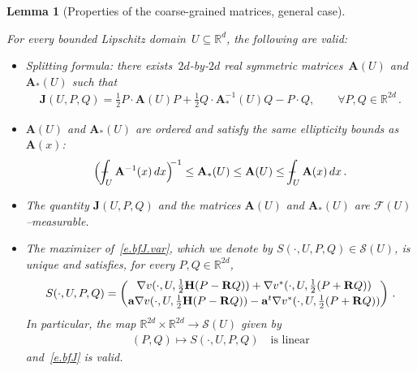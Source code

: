 \documentclass[11pt]{article} %
\numberwithin{equation}{section}
\newtheorem{lemma}[theorem]{Lemma}
\theoremstyle{definition}
\newcommand*{\R}{\ensuremath{\mathbb{R}}}
\newcommand*{\Rd}{\ensuremath{\mathbb{R}^d}}
\renewcommand{\a}{\mathbf{a}}
\newcommand{\F}{\mathcal{F}}
\def\Xint#1{\mathchoice
{\XXint\displaystyle\textstyle{#1}}%
{\XXint\textstyle\scriptstyle{#1}}%
{\XXint\scriptstyle\scriptscriptstyle{#1}}%
{\XXint\scriptscriptstyle\scriptscriptstyle{#1}}%
\!\int}
\def\XXint#1#2#3{{\setbox0=\hbox{$#1{#2#3}{\int}$}
\vcenter{\hbox{$#2#3$}}\kern-.5\wd0}}
\def\fint{\Xint-}
\newcommand{\bfA}{\mathbf{A}}
\newcommand{\bfJ}{\mathbf{J}}
\newcommand{\rota}{\mathbf{R}}
\newcommand{\refl}{\mathbf{H}}
\begin{document}
\begin{lemma}[Properties of the coarse-grained matrices, general case]
\label{l.J.basicprops.nonsymm}

For every bounded Lipschitz domain~$U \subseteq\Rd$, the following are valid:

\begin{itemize} 

\item Splitting formula: there exists~$2d$-by-$2d$ real symmetric matrices~$\bfA(U)$ and $\bfA_*(U)$ such that  
\begin{align}
\label{e.Jsplitting.nonsymm}
\bfJ(U,P,Q )
=
\frac12 P \cdot \bfA(U) P 
+ 
\frac12 Q \cdot \bfA_*^{-1}(U) Q
- P \cdot Q, \qquad \forall P,Q  \in \R^{2d}
\,.
\end{align}



\item $\bfA(U)$ and $\bfA_*(U)$ are ordered and satisfy the same ellipticity bounds as~$\bfA(x)$:
\begin{equation}
\label{e.A.bounds.nonsymm}
\Bigl( \fint_{U} \bfA^{-1} (x)\,dx \Bigr)^{\!\!-1} 
\leq 
\bfA_*(U) 
\leq 
\bfA(U) 
\leq 
\fint_U \bfA(x)\,dx 
\,.
\end{equation}

\item The quantity $\bfJ(U,P,Q )$ and the matrices $\bfA(U)$ and $\bfA_*(U)$ are $\F(U)$--measurable. 

\item The maximizer of~\eqref{e.bfJ.var}, which we denote by $S(\cdot,U,P,Q )  \in \mathcal{S}(U)$, is unique and satisfies, for every $P,Q\in\R^{2d}$,
\begin{equation}
\label{e.Stovvstar}
S( \cdot, U, P , Q)
=
\begin{pmatrix} 
\nabla v (\cdot,U,\tfrac12 \refl( P -  \rota Q))
+
\nabla v^* (\cdot,U,\tfrac12 ( P +  \rota Q))
\vspace{0.2em} \\ 
\a \nabla v (\cdot,U,\tfrac12 \refl( P -  \rota Q))
- \a^t \nabla v^*  (\cdot,U,\tfrac12 ( P +  \rota Q))
\end{pmatrix}\,.
\end{equation}
In particular, the map $\R^{2d}\times\R^{2d} \to \mathcal{S}(U)$ given by
\begin{align}
\label{e.S.linear.nonsymm}
(P,Q ) \mapsto S(\cdot,U,P,Q ) \quad \mbox{is linear}
\end{align}
and~\eqref{e.bfJ} is valid. 



\end{itemize}
\end{lemma}
\end{document}
